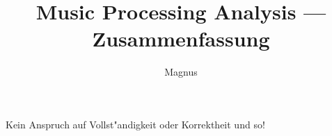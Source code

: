 \documentclass[fleqn,12pt,draft]{scrartcl}
\title{Music Processing Analysis --- Zusammenfassung}
\author{Magnus}
\begin{document}
\maketitle
\begin{center}Kein Anspruch auf Vollst"andigkeit oder Korrektheit und so!\end{center}

	\tableofcontents







\end{document}
